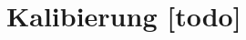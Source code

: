 \begin{comment}
--------------------------------------------------------------------------------
- Versuchsaufbau für die Kalibierung
	- Dreieck
	- Antennenverzögerung initial auf 0
	- Von jedem Tag 1000 Aufnahmen pro Anchor => 3*2*1000 = 6000
	- Kalibierung durchführen mit LGS und mit DecaWave
	- Ergebnisse vergleichen
	- Antennenverzögerung aus LGS/DecaWave einstellung
		- Von jedem Tag 1000 Aufnahmen pro Anchor => 3*2*1000 = 6000
		- Von jedem Tag 1000 Aufnahmen pro Anchor => 3*2*1000 = 6000
	- Ergebnisse vergleichen
- Hilfreiche Diagramme
	- Keine
- Tabelle 1
	- Kalibierungsart {Keine, DecaWave, LGS}
	- Von, Nach
	- Ground Truth [m]
	- Aritmetischer Mittelwert [m]
	- Standardabweichung [m]
- Tabelle 2
	- Beacon
	- Antennenverzögerung {DecaWave, LGS}
	
- 3-sigma
	- https://www.easycalculation.com/statistics/learn-three-sigma.php
	- https://bizfluent.com/how-5214886-calculate-sigma.html
	- https://stackoverflow.com/questions/28699342/calculate-the-3rd-standard-deviation-for-an-array

	
\end{comment}
\section{Kalibierung [todo]}


\begin{comment}
--------------------------------------------------------------------------------
- Mit welchen Einstellungen kommt man auf die Entfernungsmessung?
- Streuung?
- LOS/NLOS {Holz, Bücher, Menschlicher Körper}
	- Welcher Fehler ergibt zwischen LOS/NLOS?
- Wie verändert sich die Genauigkeit der Entfernungsmessung bei einer direkten Sichtverbindung (engl. Line--of--sight (LOS)) und indirekten Sichtverbindung (engl. Non--line--of--sight (NLOS))?
- isaacs2009optimal - Optimal sensor placement for time difference of arrival localization
- Diagramme
	- \cite{kurth2003experimental}
		- Fig. 2: Sample PDFs showing the true ranges associated with 20, 30, and 50 ft measured ranges. (X: true range, Y:count)
		- Fig. 3: The mean true distances to RF tags vs. measured distances (X:measured range, Y: true range)
		- Fig. 4: The variance in true distances to RF tags vs. measured distances (X:measured range (ft), Y: variance (ft^2))
	
- https://matheguru.com/stochastik/standardfehler.html
- https://de.wikipedia.org/wiki/Standardfehler

- Lichtgeschwindigkeit
	- https://de.wikipedia.org/wiki/Lichtgeschwindigkeit
	- In bodennaher Luft ist die Lichtgeschwindigkeit etwa 0,28 ‰ geringer als im Vakuum (also ca. 299.710 km/s), in Wasser beträgt sie etwa 225.000 km/s (−25 %
	
\end{comment}
